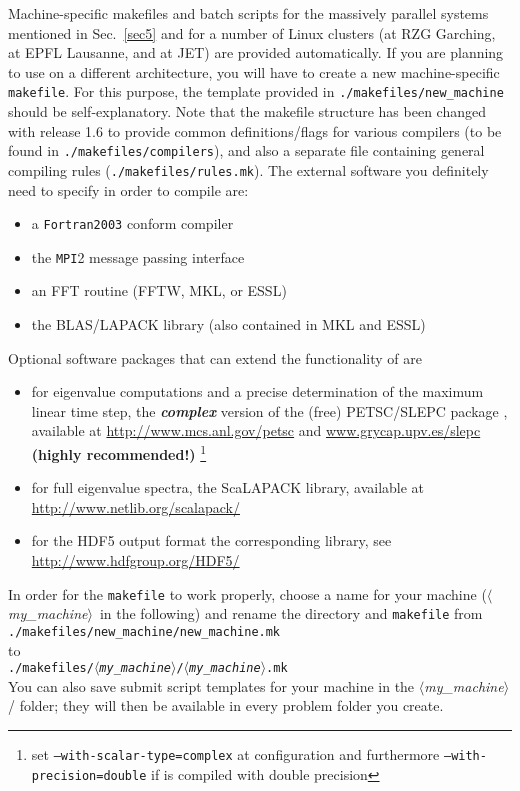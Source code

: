 \documentclass[12pt]{article}
\newcommand{\mach}{$\langle$\textsl{my\_machine}$\rangle$}
\begin{document}
Machine-specific makefiles and batch scripts for the massively parallel systems mentioned in Sec.~\ref{sec5} and for a
number of Linux clusters (at RZG Garching, at EPFL Lausanne, and at JET) are provided automatically. If
you are planning to use \gene on a different architecture, you will have to create a new machine-specific
{\tt makefile}. For this purpose, the template provided in \texttt{./makefiles/new\_machine} should
be self-explanatory. Note that the makefile structure has been changed with release 1.6 to provide common
definitions/flags for various compilers (to be found in \texttt{./makefiles/compilers}), and also a separate
file containing general compiling rules (\texttt{./makefiles/rules.mk}).
The external software you definitely need to specify in order to compile \gene are:
\begin{itemize}
\item a {\tt Fortran2003} conform compiler
\item the {\tt MPI}2 message passing interface
\item an FFT routine (FFTW, MKL, or ESSL)
\item the BLAS/LAPACK library (also contained in MKL and ESSL)
\end{itemize}
Optional software packages that can extend the functionality of \gene are
\begin{itemize}
\item for eigenvalue computations and a precise determination of the maximum linear time step,
the {\bf \emph{complex}} version of the (free) PETSC/SLEPC package
\cite{petsc1,petsc2,slepc}, available at \url{http://www.mcs.anl.gov/petsc}
and \url{www.grycap.upv.es/slepc} {\bf (highly recommended!)}
\footnote{set {\tt --with-scalar-type=complex} at configuration and furthermore {\tt --with-precision=double} if \gene is compiled with double precision}
\item for full eigenvalue spectra, the ScaLAPACK library, available at \url{http://www.netlib.org/scalapack/}
\item for the HDF5 output format the corresponding library, see \url{http://www.hdfgroup.org/HDF5/}
\end{itemize}
In order for the {\tt makefile} to work properly, choose a name for
your machine (\mach\ in the following) and rename the directory and {\tt makefile} from\\
\texttt{./makefiles/new\_machine/new\_machine.mk}\\ to\\ \texttt{./makefiles/\mach/\mach.mk}\\
You can also save submit script templates for your machine in the \mach/ folder; they will then be
available in every problem folder you create.
\end{document}
